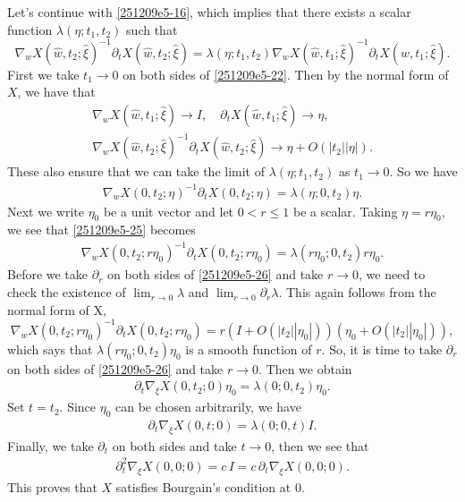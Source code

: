 \documentclass{article}
\numberwithin{equation}{section}
\theoremstyle{plain}
\begin{document}
Let's continue with \eqref{251209e5-16}, which implies that there exists a scalar function $\lambda(\eta;t_1,t_2)$ such that
\begin{equation}\label{251209e5-22}
    \nabla_w X(\hat{w},t_2;\hat{\xi})^{-1}\partial_t X(\hat{w},t_2;\hat{\xi})= \lambda(\eta;t_1,t_2) \nabla_w X(\hat{w},t_1;\hat{\xi})^{-1} \partial_t X(\hat{w},t_1;\hat{\xi}).
\end{equation}
First we take $t_1\to 0$ on both sides of \eqref{251209e5-22}. Then by the normal form of $X$, we have that
\begin{align}
    \nabla_w X(\hat{w},t_1;\hat{\xi})\to I,\quad \partial_t X(\hat{w},t_1;\hat{\xi})\to \eta,\quad\quad \label{251209e5-23} \\
    \nabla_w X(\hat{w},t_2;\hat{\xi})^{-1}\partial_t X(\hat{w},t_2;\hat{\xi})\to \eta+ O(|t_2||\eta|). \label{251209e5-24}
\end{align}
These also ensure that we can take the limit of $\lambda(\eta;t_1,t_2)$ as $t_1\to 0$.
So we have
\begin{align}\label{251209e5-25}
    \nabla_w X(0,t_2;\eta)^{-1}\partial_t X(0,t_2;\eta)= \lambda(\eta;0,t_2)\eta.
\end{align}
Next we write $\eta_0$ be a unit vector and let $0< r\le 1$ be a scalar. Taking $\eta=r\eta_0$, we see that \eqref{251209e5-25} becomes
\begin{align}\label{251209e5-26}
    \nabla_w X(0,t_2;r\eta_0)^{-1}\partial_t X(0,t_2;r\eta_0)= \lambda(r\eta_0;0,t_2)r\eta_0.
\end{align}
Before we take $\partial_r$ on both sides of \eqref{251209e5-26} and take $r\to 0$, we need to check the existence of $\lim_{r\to 0}\lambda$ and $\lim_{r\to 0}\partial_r \lambda$. This again follows from the normal form of X,
\begin{equation}
    \nabla_w X(0,t_2;r\eta_0)^{-1}\partial_t X(0,t_2;r\eta_0)= r(I+O(|t_2||\eta_0|))(\eta_0+O(|t_2||\eta_0|)),
\end{equation}
which says that $\lambda(r\eta_0;0,t_2)\eta_0$ is a smooth function of $r$. So, it is time to take $\partial_r$ on both sides of \eqref{251209e5-26} and take $r\to 0$. Then we obtain
\begin{align}
    \partial_t \nabla_\xi X(0,t_2;0)\eta_0= \lambda(0;0,t_2)\eta_0.
\end{align}
Set $t=t_2$. Since $\eta_0$ can be chosen arbitrarily, we have
\begin{align}
    \partial_t \nabla_\xi X(0,t;0)= \lambda(0;0,t)I.
\end{align}
Finally, we take $\partial_{t}$ on both sides and take $t\to 0$, then we see that
\begin{align}
    \partial^2_t \nabla_\xi X(0,0;0)= c\,I= c\,\partial_t \nabla_\xi X(0,0;0).
\end{align}
This proves that $X$ satisfies Bourgain's condition at 0.
\end{document}
